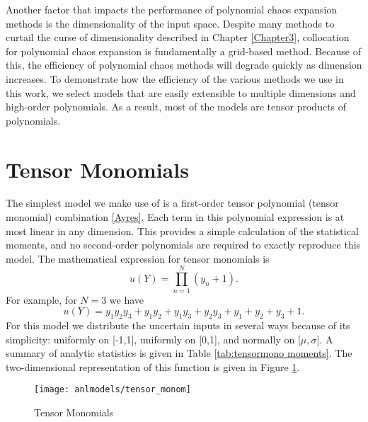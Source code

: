 Another factor that impacts the performance of polynomial chaos expansion methods is the dimensionality of the input space.  Despite 
many methods to curtail the curse of dimensionality described in Chapter \ref{Chapter3}, collocation for polynomial chaos expansion
is fundamentally a grid-based method.  Because of this, the efficiency of polynomial chaos methods will degrade quickly as
dimension increases.  To demonstrate how the efficiency of the various methods we use in this work, we select models that are
easily extensible to multiple dimensions and high-order polynomials.  As a result, most of the models are tensor products of
polynomials.


\section{Tensor Monomials}\label{mod:first tensor poly}
The simplest model we make use of is a first-order tensor polynomial (tensor monomial) combination \ref{Ayres}.
Each term in this polynomial expression is at most linear in any dimension.  This provides a simple calculation
of the statistical moments, and no second-order polynomials are required to exactly reproduce this model.
The mathematical expression for tensor monomials is
\begin{equation}
  u(Y) = \prod_{n=1}^N (y_n+1).
\end{equation}
For example, for $N=3$ we have
\begin{equation}
  u(Y) = y_1y_2y_3 + y_1y_2 + y_1y_3 + y_2y_3 + y_1 + y_2 + y_3 + 1.
\end{equation}
For this model we distribute the uncertain inputs in several ways because of its simplicity: uniformly on [-1,1], uniformly on
[0,1], and normally on [$\mu,\sigma$]. A summary of analytic statistics is given in Table \ref{tab:tensormono moments}.
The two-dimensional representation of this function is given in Figure \ref{fig: tensor monomials}.
\begin{figure}[htb]
  \centering
  \texttt{[image: anlmodels/tensor\_monom]}
  \caption{Tensor Monomials}
  \label{fig: tensor monomials}
\end{figure}

